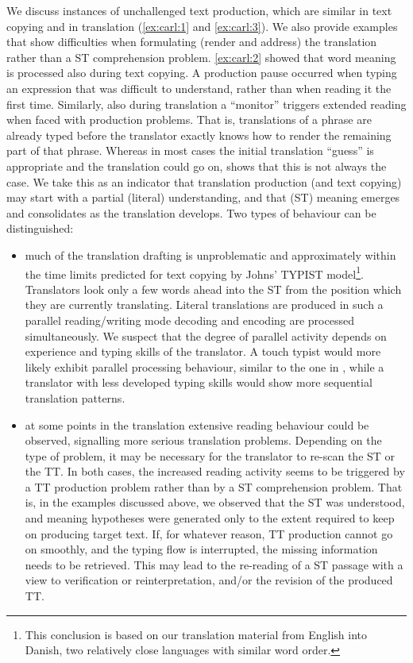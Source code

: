 \documentclass[output=paper]{LSP/langsci}
\begin{document}
\largerpage
We discuss instances of unchallenged text production, which are similar in text copying and in translation (\ref{ex:carl:1} and \ref{ex:carl:3}). We also provide examples that show difficulties when formulating (render and address) the translation rather than a ST comprehension problem. \ref{ex:carl:2} showed that word meaning is processed also during text copying. A production pause occurred when typing an expression that was difficult to understand, rather than when reading it the first time. Similarly, also during translation a ``monitor'' triggers extended reading when faced with production problems. That is, translations of a phrase are already typed before the translator exactly knows how to render the remaining part of that phrase. Whereas in most cases the initial translation ``guess'' is appropriate and the translation could go on,  shows that this is not always the case. We take this as an indicator that translation production (and text copying) may start with a partial (literal) understanding, and that (ST) meaning emerges and consolidates as the translation develops. Two  types of behaviour can be distinguished: 

\begin{itemize}
\item
much of the translation drafting is unproblematic and approximately with\-in the time limits predicted for text copying by Johns' TYPIST model\footnote{This conclusion is based on our translation material from English into Danish, two relatively close  languages with similar word order.}. Translators look only a few words ahead into the ST from the position which they are currently translating. Literal translations are produced in such a parallel reading/writing mode decoding and encoding are processed simultaneously. We suspect that the degree of parallel activity depends on experience and typing skills of the translator. A touch typist would more likely exhibit parallel processing behaviour, similar to the one in , while a translator with less developed typing skills would show more sequential translation patterns. 
\item
at some points in the translation extensive reading behaviour could be observed, signalling more serious translation problems. Depending on the type of problem, it may be necessary for the translator to re-scan the ST or the TT. In both cases, the increased reading activity seems to be triggered by a TT production problem rather than by a ST comprehension problem. That is, in the examples discussed above, we observed that the ST was understood, and meaning hypotheses were generated only to the extent required to keep on producing target text. If, for whatever reason, TT production cannot go on smoothly, and the typing flow is interrupted, the missing information needs to be retrieved. This may lead to the re-reading of a ST passage with a view to verification or reinterpretation, and/or the revision of the produced TT. 
\end{itemize}
\end{document}
